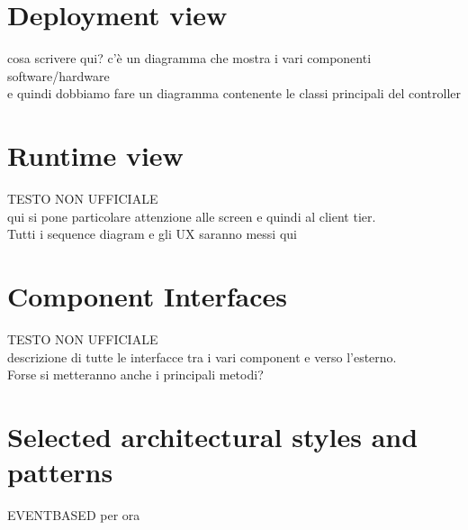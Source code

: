 \documentclass[\mainpath/main]{subfiles}
\begin{document}
\section{Deployment view}
\label{ArchitecturalDesign:deploy}

cosa scrivere qui? c'è un diagramma che mostra i vari componenti software/hardware\\
e quindi dobbiamo fare un diagramma contenente le classi principali del controller

\section{Runtime view}
\label{ArchitecturalDesign:runtime}

TESTO NON UFFICIALE\\
qui si pone particolare attenzione alle screen e quindi al client tier.\\
Tutti i sequence diagram e gli UX saranno messi qui\\

\section{Component Interfaces}
\label{ArchitecturalDesign:comp_interfaces}

TESTO NON UFFICIALE\\
descrizione di tutte le interfacce tra i vari component e verso l'esterno.\\
Forse si metteranno anche i principali metodi?\\


\section{Selected architectural styles and patterns}
\label{ArchitecturalDesign:design_patterns}


EVENTBASED per ora\\


\end{document}

